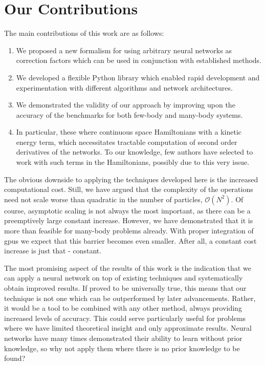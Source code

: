 \documentclass[Thesis.tex]{subfiles}
\begin{document}
\section{Our Contributions}

The main contributions of this work are as follows:

\begin{enumerate}
  \item We proposed a new formalism for using arbitrary neural networks as
    correction factors which can be used in conjunction with established
    methods.
  \item We developed a flexible Python library which enabled rapid development
    and experimentation with different algorithms and network architectures.
  \item We demonstrated the validity of our approach by
    improving upon the accuracy of the benchmarks for both few-body and
    many-body systems.
    \item In particular, these where continuous space Hamiltonians with a
      kinetic energy term, which necessitates tractable computation of second
      order derivatives of the networks. To our knowledge, few authors have
      selected to work with such terms in the Hamiltonians, possibly due to this
      very issue.
\end{enumerate}

The obvious downside to applying the techniques developed here is the increased
computational cost. Still, we have argued that the complexity of the operations
need not scale worse than quadratic in the number of particles,
$\mathcal{O}(N^2)$. Of course, asymptotic scaling is not always the most
important, as there can be a preemptively large constant increase. However, we
have demonstrated that it is more than feasible for many-body problems already.
With proper integration of \glspl{gpu} we expect that this barrier becomes even
smaller. After all, a constant cost increase is just that - constant.

The most promising aspect of the results of this work is the indication that we
can apply a neural network on top of existing techniques and systematically
obtain improved results. If proved to be universally true, this means that our
technique is not one which can be outperformed by later advancements. Rather, it
would be a tool to be combined with any other method, always providing increased
levels of accuracy. This could serve particularly useful for problems where we
have limited theoretical insight and only approximate results. Neural networks
have many times demonstrated their ability to learn without prior knowledge, so
why not apply them where there is no prior knowledge to be found?
\end{document}
